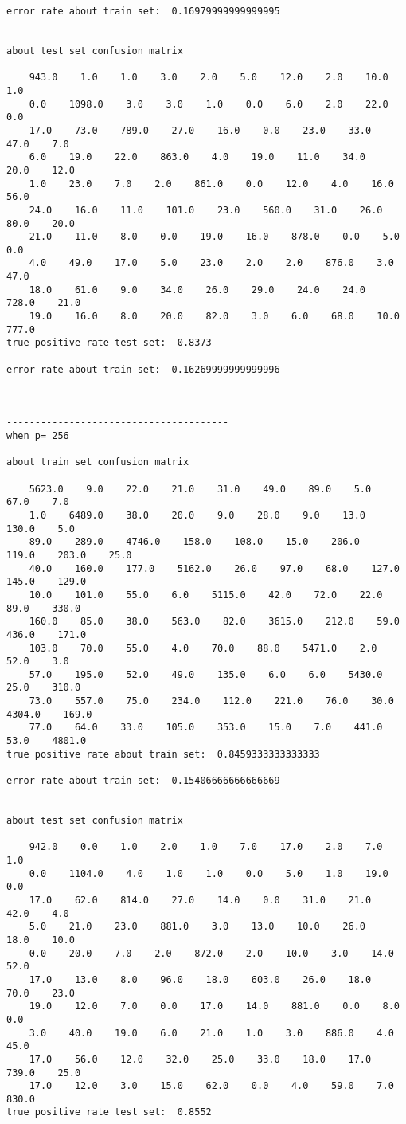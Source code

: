 \documentclass[11pt]{article}
\begin{document}
\begin{Verbatim}[commandchars=\\\{\}]
error rate about train set:  0.16979999999999995


about test set confusion matrix

    943.0    1.0    1.0    3.0    2.0    5.0    12.0    2.0    10.0    1.0
    0.0    1098.0    3.0    3.0    1.0    0.0    6.0    2.0    22.0    0.0
    17.0    73.0    789.0    27.0    16.0    0.0    23.0    33.0    47.0    7.0
    6.0    19.0    22.0    863.0    4.0    19.0    11.0    34.0    20.0    12.0
    1.0    23.0    7.0    2.0    861.0    0.0    12.0    4.0    16.0    56.0
    24.0    16.0    11.0    101.0    23.0    560.0    31.0    26.0    80.0    20.0
    21.0    11.0    8.0    0.0    19.0    16.0    878.0    0.0    5.0    0.0
    4.0    49.0    17.0    5.0    23.0    2.0    2.0    876.0    3.0    47.0
    18.0    61.0    9.0    34.0    26.0    29.0    24.0    24.0    728.0    21.0
    19.0    16.0    8.0    20.0    82.0    3.0    6.0    68.0    10.0    777.0
true positive rate test set:  0.8373

error rate about train set:  0.16269999999999996



---------------------------------------
when p= 256

about train set confusion matrix

    5623.0    9.0    22.0    21.0    31.0    49.0    89.0    5.0    67.0    7.0
    1.0    6489.0    38.0    20.0    9.0    28.0    9.0    13.0    130.0    5.0
    89.0    289.0    4746.0    158.0    108.0    15.0    206.0    119.0    203.0    25.0
    40.0    160.0    177.0    5162.0    26.0    97.0    68.0    127.0    145.0    129.0
    10.0    101.0    55.0    6.0    5115.0    42.0    72.0    22.0    89.0    330.0
    160.0    85.0    38.0    563.0    82.0    3615.0    212.0    59.0    436.0    171.0
    103.0    70.0    55.0    4.0    70.0    88.0    5471.0    2.0    52.0    3.0
    57.0    195.0    52.0    49.0    135.0    6.0    6.0    5430.0    25.0    310.0
    73.0    557.0    75.0    234.0    112.0    221.0    76.0    30.0    4304.0    169.0
    77.0    64.0    33.0    105.0    353.0    15.0    7.0    441.0    53.0    4801.0
true positive rate about train set:  0.8459333333333333

error rate about train set:  0.15406666666666669


about test set confusion matrix

    942.0    0.0    1.0    2.0    1.0    7.0    17.0    2.0    7.0    1.0
    0.0    1104.0    4.0    1.0    1.0    0.0    5.0    1.0    19.0    0.0
    17.0    62.0    814.0    27.0    14.0    0.0    31.0    21.0    42.0    4.0
    5.0    21.0    23.0    881.0    3.0    13.0    10.0    26.0    18.0    10.0
    0.0    20.0    7.0    2.0    872.0    2.0    10.0    3.0    14.0    52.0
    17.0    13.0    8.0    96.0    18.0    603.0    26.0    18.0    70.0    23.0
    19.0    12.0    7.0    0.0    17.0    14.0    881.0    0.0    8.0    0.0
    3.0    40.0    19.0    6.0    21.0    1.0    3.0    886.0    4.0    45.0
    17.0    56.0    12.0    32.0    25.0    33.0    18.0    17.0    739.0    25.0
    17.0    12.0    3.0    15.0    62.0    0.0    4.0    59.0    7.0    830.0
true positive rate test set:  0.8552


\end{Verbatim}
\end{document}

